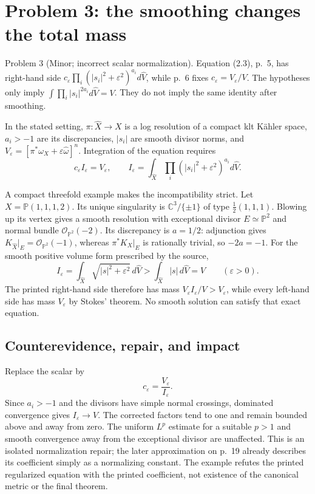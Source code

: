\documentclass[10pt]{article}
\begin{document}
\section*{Problem 3: the smoothing changes the total mass}
Problem 3 (Minor; incorrect scalar normalization).  Equation (2.3), p. 5, has right-hand side \(c_\varepsilon\prod_i(|s_i|^2+\varepsilon^2)^{a_i}d\widehat V\), while p. 6 fixes \(c_\varepsilon=V_\varepsilon/V\). The hypotheses only imply \(\int\prod_i|s_i|^{2a_i}d\widehat V=V\). They do not imply the same identity after smoothing.\par
In the stated setting, \(\pi:\widehat X\to X\) is a log resolution of a compact klt Kähler space, \(a_i>-1\) are its discrepancies, \(|s_i|\) are smooth divisor norms, and \(V_\varepsilon=[\pi^*\omega_X+\varepsilon\widehat\omega]^n\). Integration of the equation requires \[c_\varepsilon I_\varepsilon=V_\varepsilon,\qquad
 I_\varepsilon=\int_{\widehat X}
       \prod_i(|s_i|^2+\varepsilon^2)^{a_i}d\widehat V.\]\par
A compact threefold example makes the incompatibility strict. Let \(X=\mathbb P(1,1,1,2)\). Its unique singularity is \(\mathbb C^3/\{\pm1\}\) of type \(\tfrac12(1,1,1)\). Blowing up its vertex gives a smooth resolution with exceptional divisor \(E\simeq\mathbb P^2\) and normal bundle \(\mathcal O_{\mathbb P^2}(-2)\). Its discrepancy is \(a=1/2\): adjunction gives \(K_{\widehat X}|_E=\mathcal O_{\mathbb P^2}(-1)\), whereas \(\pi^*K_X|_E\) is rationally trivial, so \(-2a=-1\). For the smooth positive volume form prescribed by the source, \[I_\varepsilon=\int_{\widehat X}\sqrt{|s|^2+\varepsilon^2}\,d\widehat V
 >\int_{\widehat X}|s|\,d\widehat V=V
 \qquad(\varepsilon>0).\] The printed right-hand side therefore has mass \(V_\varepsilon I_\varepsilon/V>V_\varepsilon\), while every left-hand side has mass \(V_\varepsilon\) by Stokes’ theorem. No smooth solution can satisfy that exact equation.\par
\subsection*{Counterevidence, repair, and impact}
Replace the scalar by \[c_\varepsilon=\frac{V_\varepsilon}{I_\varepsilon}.\] Since \(a_i>-1\) and the divisors have simple normal crossings, dominated convergence gives \(I_\varepsilon\to V\). The corrected factors tend to one and remain bounded above and away from zero. The uniform \(L^p\) estimate for a suitable \(p>1\) and smooth convergence away from the exceptional divisor are unaffected. This is an isolated normalization repair; the later approximation on p. 19 already describes its coefficient simply as a normalizing constant. The example refutes the printed regularized equation with the printed coefficient, not existence of the canonical metric or the final theorem.\par
\end{document}
